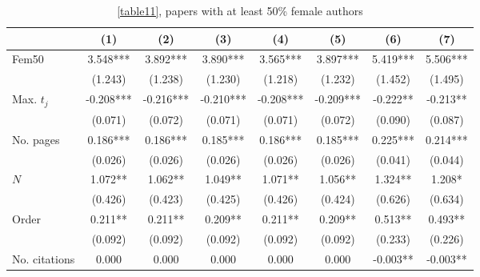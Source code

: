 \begin{table}[H]
    \begin{adjustwidth}{-0.085cm}{}
    \footnotesize
    \centering
    \begin{threeparttable}
        \caption{\autoref{table11}, papers with at least 50\% female authors}
        \label{table11XC}
        \begin{tabular}{p{2.64cm}SSSSSSS}
            \toprule
            &{(1)}&{(2)}&{(3)}&{(4)}&{(5)}&{(6)}&{(7)}\\
            \midrule
            Fem50                         &       3.548***&       3.892***&       3.890***&       3.565***&       3.897***&       5.419***&       5.506***\\
                                          &     (1.243)   &     (1.238)   &     (1.230)   &     (1.218)   &     (1.232)   &     (1.452)   &     (1.495)   \\
            Max. \(t_j\)                  &      -0.208***&      -0.216***&      -0.210***&      -0.208***&      -0.209***&      -0.222** &      -0.213** \\
                                          &     (0.071)   &     (0.072)   &     (0.071)   &     (0.071)   &     (0.072)   &     (0.090)   &     (0.087)   \\
            No. pages                     &       0.186***&       0.186***&       0.185***&       0.186***&       0.185***&       0.225***&       0.214***\\
                                          &     (0.026)   &     (0.026)   &     (0.026)   &     (0.026)   &     (0.026)   &     (0.041)   &     (0.044)   \\
            \(N\)                         &       1.072** &       1.062** &       1.049** &       1.071** &       1.056** &       1.324** &       1.208*  \\
                                          &     (0.426)   &     (0.423)   &     (0.425)   &     (0.426)   &     (0.424)   &     (0.626)   &     (0.634)   \\
            Order                         &       0.211** &       0.211** &       0.209** &       0.211** &       0.209** &       0.513** &       0.493** \\
                                          &     (0.092)   &     (0.092)   &     (0.092)   &     (0.092)   &     (0.092)   &     (0.233)   &     (0.226)   \\
            No. citations                 &       0.000   &       0.000   &       0.000   &       0.000   &       0.000   &      -0.003** &      -0.003** \\

\end{tabular}
\end{threeparttable}
\end{adjustwidth}
\end{table}
